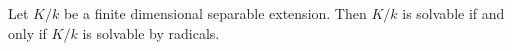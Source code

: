 Let $K/k$ be a finite dimensional separable extension. Then $K/k$ is solvable if and only if $K/k$ is solvable by radicals.
